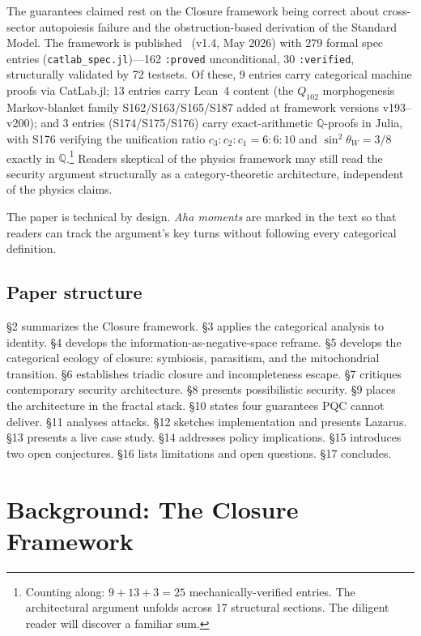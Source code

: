 \documentclass[11pt,a4paper]{article}
\theoremstyle{definition}
\theoremstyle{remark}
\begin{document}
The guarantees claimed rest on the Closure framework being correct about cross-sector autopoiesis failure and the obstruction-based derivation of the Standard Model. The framework is published~\cite{green2026} (v1.4, May 2026) with 279 formal spec entries (\texttt{catlab\_spec.jl})---162 \texttt{:proved} unconditional, 30 \texttt{:verified}, structurally validated by 72 testsets. Of these, 9 entries carry categorical machine proofs via CatLab.jl; 13 entries carry Lean~4 content (the $Q_{102}$ morphogenesis Markov-blanket family S162/S163/S165/S187 added at framework versions v193--v200); and 3 entries (S174/S175/S176) carry exact-arithmetic $\mathbb{Q}$-proofs in Julia, with S176 verifying the unification ratio $c_3{:}c_2{:}c_1 = 6{:}6{:}10$ and $\sin^2\theta_W = 3/8$ exactly in $\mathbb{Q}$.\footnote{Counting along: $9 + 13 + 3 = 25$ mechanically-verified entries. The architectural argument unfolds across 17 structural sections. The diligent reader will discover a familiar sum.} Readers skeptical of the physics framework may still read the security argument structurally as a category-theoretic architecture, independent of the physics claims.

The paper is technical by design. \emph{Aha moments} are marked in the text so that readers can track the argument's key turns without following every categorical definition.

\subsection{Paper structure}

\S2 summarizes the Closure framework. \S3 applies the categorical analysis to identity. \S4 develops the information-as-negative-space reframe. \S5 develops the categorical ecology of closure: symbiosis, parasitism, and the mitochondrial transition. \S6 establishes triadic closure and incompleteness escape. \S7 critiques contemporary security architecture. \S8 presents possibilistic security. \S9 places the architecture in the fractal stack. \S10 states four guarantees PQC cannot deliver. \S11 analyses attacks. \S12 sketches implementation and presents Lazarus. \S13 presents a live case study. \S14 addresses policy implications. \S15 introduces two open conjectures. \S16 lists limitations and open questions. \S17 concludes.

\section{Background: The Closure Framework}
\end{document}

